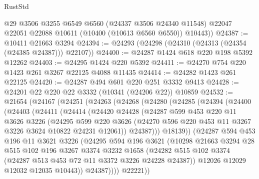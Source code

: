 \begin{lexlean}{RustStd}
\begin{coremodule}
        @29
        @3506
        @3255
        @6549
        @6560
        (@24337 @3506 @24340 @11548)
        @22047
        @22051
        @22088
        @10611
        (@10400 (@10613 @6560 @6550))
        @10443))
@24387 := @10411 @21663 @3294
@24394 := @24293 (@24298 (@24310 (@24313 (@24354 (@24385 @24387))) @22107))
@24400 := @24287 @1424 @618 @220 @198 @5392 @12262
@24403 := @24295 @1424 @220 @5392
@24411 := @24270 @754 @220 @1423 @261 @3267 @22125 @4088 @11435
@24414 := @24282 @1423 @261 @22125
@24420 := @24287 @494 @601 @220 @251 @3332 @9413
@24428 := @24201 @22 @220 @22 @3332 (@10341 (@24206 @22)) @10859
@24532 := @21654
    (@24167
      (@24251
        (@24263
          (@24268
            (@24280
              (@24285
                (@24394
                  (@24400
                    (@24403
                      (@24411
                        (@24414
                          (@24420
                            @24428
                            (@24287
                              @599
                              @453
                              @220
                              @11
                              @3626
                              @3226
                              (@24295
                                @599
                                @220
                                @3626
                                (@24270 @596 @220 @453 @11 @3267 @3226 @3624 @10822 @24231 @12061))
                              @24387)))
                        @18139))
                    (@24287
                      @594
                      @453
                      @196
                      @11
                      @3621
                      @3226
                      (@24295
                        @594
                        @196
                        @3621
                        (@10298
                          @21663
                          @3294
                          @28
                          @515
                          @102
                          @196
                          @3267
                          @3374
                          @3232
                          @1658
                          (@24282
                            @515
                            @102
                            @3374
                            (@24287 @513 @453 @72 @11 @3372 @3226 @24228 @24387))
                          @12026
                          @12029
                          @12032
                          @12035
                          @10443))
                      @24387))))
              @22221))

\end{coremodule}
\end{lexlean}
